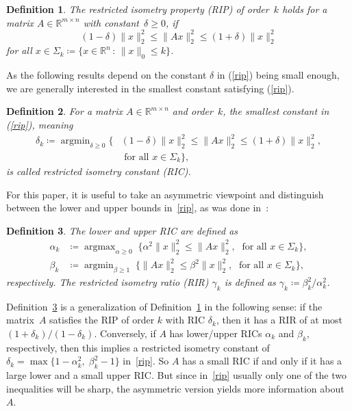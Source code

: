 \documentclass[journal]{IEEEtran}
\newtheorem{definition}{Definition}
\DeclareMathOperator*{\argmin}{argmin}
\DeclareMathOperator*{\argmax}{argmax}
\newcommand{\suchthat}{\,:\,}
\newcommand{\define}{\coloneqq}
\newcommand{\Norm}[2]{\lVert{#1}\rVert_{#2}}
\newcommand{\R}{\mathds{R}}
\begin{document}
\begin{definition}\label{ripdef}
  The \emph{restricted isometry property} (RIP) of order~$k$ holds for a
  matrix $A \in \R^{m \times n}$ with constant~$\delta \geq 0$, if
  \begin{equation}\label{rip}
    (1 - \delta) \Norm{x}{2}^2 \leq \Norm{Ax}{2}^2 \leq (1+\delta) \Norm{x}{2}^2
  \end{equation}
  for all $x \in \Sigma_k \define \{x \in \R^n \suchthat \Norm{x}{0} \leq k\}$.
\end{definition}

As the following results depend on the constant $\delta$ in (\ref{rip}) being
small enough, we are generally interested in the smallest constant satisfying
(\ref{rip}).

\begin{definition}\label{ricdef}
For a matrix $A \in \R^{m \times n}$ and order~$k$, the smallest constant in 
(\ref{rip}), meaning
\begin{equation}\label{ric}
 \begin{aligned}
  \delta_k \define \argmin_{\delta \geq 0} \{&(1 - \delta) \Norm{x}{2}^2 \leq \Norm{Ax}{2}^2 \leq (1+\delta) \Norm{x}{2}^2 ,\\
  & \text{ for all }x \in \Sigma_k\},
 \end{aligned}
\end{equation}
is called \emph{restricted isometry constant} (RIC).
\end{definition}

For this paper, it is useful to take an asymmetric viewpoint and
distinguish between the lower and upper bounds in~\eqref{rip}, as was done
in~\cite{FL09}:

\begin{definition}\label{asymRIPdef}
 The \emph{lower} and \emph{upper RIC} are defined as
 \begin{align}
   \alpha_k & \define \argmax_{\alpha \geq 0}\; \{ \alpha^2 \Norm{x}{2}^2
   \leq \Norm{Ax}{2}^2,\; \text{ for all }x \in \Sigma_k\}, \label{lowerRIP}\\
   \beta_k & \define \argmin_{\beta \geq 1}\; \{ \Norm{Ax}{2}^2 \leq \beta^2
   \Norm{x}{2}^2,\; \text{ for all }x \in \Sigma_k\},\label{upperRIP}
 \end{align}
 respectively. The \emph{restricted isometry ratio} (RIR) $\gamma_k$ is
 defined as $\gamma_k \define \beta_k^2 / \alpha_k^2$.
\end{definition}

%
Definition~\ref{asymRIPdef} is a generalization of Definition~\ref{ripdef}
in the following sense: if the matrix~$A$ satisfies the RIP of order $k$
with RIC $\delta_k$, then it has a RIR of at most $(1 + \delta_k) / (1 -
\delta_k)$. Conversely, if $A$ has lower/upper RICs $\alpha_k$ and
$\beta_k$, respectively, then this implies a restricted isometry constant
of $\delta_k = \max \{1 - \alpha_k^2,\; \beta_k^2 - 1\}$ in~\eqref{rip}.
So $A$ has a small RIC if and only if it has a large lower and a small upper 
RIC. But since in~\eqref{rip} usually only one of the two inequalities will 
be sharp, the asymmetric version yields more information about~$A$.
 
\end{document}
